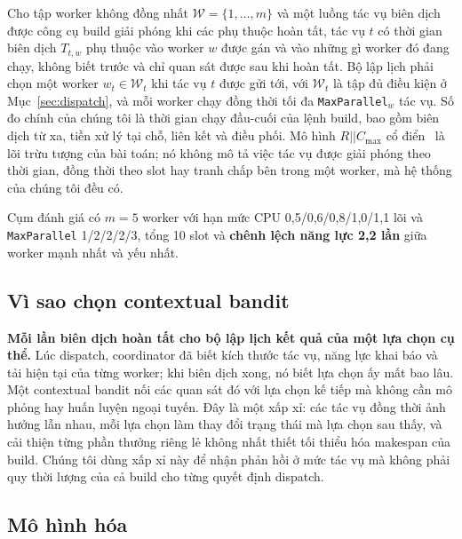 \documentclass[final,5p,times,twocolumn]{elsarticle}
\begin{document}
Cho tập worker không đồng nhất $\mathcal{W}=\{1,\dots,m\}$ và một luồng tác vụ biên dịch được công cụ build giải phóng khi các phụ thuộc hoàn tất, tác vụ $t$ có thời gian biên dịch $T_{t,w}$ phụ thuộc vào worker $w$ được gán và vào những gì worker đó đang chạy, không biết trước và chỉ quan sát được sau khi hoàn tất. Bộ lập lịch phải chọn một worker $w_t\in\mathcal{W}_t$ khi tác vụ $t$ được gửi tới, với $\mathcal{W}_t$ là tập đủ điều kiện ở Mục~\ref{sec:dispatch}, và mỗi worker chạy đồng thời tối đa \texttt{MaxParallel}$_w$ tác vụ. Số đo chính của chúng tôi là thời gian chạy đầu-cuối của lệnh build, bao gồm biên dịch từ xa, tiền xử lý tại chỗ, liên kết và điều phối. Mô hình $R||C_{\max}$ cổ điển~\cite{lenstra1990} là lõi trừu tượng của bài toán; nó không mô tả việc tác vụ được giải phóng theo thời gian, đồng thời theo slot hay tranh chấp bên trong một worker, mà hệ thống của chúng tôi đều có.

Cụm đánh giá có $m=5$ worker với hạn mức CPU 0,5/0,6/0,8/1,0/1,1 lõi và \texttt{MaxParallel} 1/2/2/2/3, tổng 10 slot và \textbf{chênh lệch năng lực 2,2 lần} giữa worker mạnh nhất và yếu nhất.

\subsection{Vì sao chọn contextual bandit}

\textbf{Mỗi lần biên dịch hoàn tất cho bộ lập lịch kết quả của một lựa chọn cụ thể.} Lúc dispatch, coordinator đã biết kích thước tác vụ, năng lực khai báo và tải hiện tại của từng worker; khi biên dịch xong, nó biết lựa chọn ấy mất bao lâu. Một contextual bandit nối các quan sát đó với lựa chọn kế tiếp mà không cần mô phỏng hay huấn luyện ngoại tuyến. Đây là một xấp xỉ: các tác vụ đồng thời ảnh hưởng lẫn nhau, mỗi lựa chọn làm thay đổi trạng thái mà lựa chọn sau thấy, và cải thiện từng phần thưởng riêng lẻ không nhất thiết tối thiểu hóa makespan của build. Chúng tôi dùng xấp xỉ này để nhận phản hồi ở mức tác vụ mà không phải quy thời lượng của cả build cho từng quyết định dispatch.

\subsection{Mô hình hóa}
\label{sec:reward}
\end{document}
